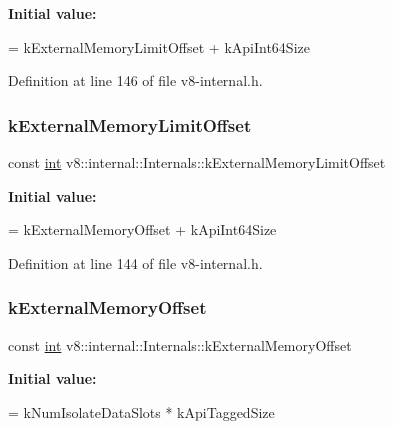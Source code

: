 {\bfseries Initial value\+:}
\begin{DoxyCode}
=
      kExternalMemoryLimitOffset + kApiInt64Size
\end{DoxyCode}


Definition at line 146 of file v8-\/internal.\+h.

\mbox{\label{classv8_1_1internal_1_1Internals_ac38870732a7ff5fb135a78a911e9dbc6}} 
\subsubsection{\texorpdfstring{k\+External\+Memory\+Limit\+Offset}{kExternalMemoryLimitOffset}}
{\footnotesize\ttfamily const \mbox{\hyperlink{classint}{int}} v8\+::internal\+::\+Internals\+::k\+External\+Memory\+Limit\+Offset\hspace{0.3cm}{\ttfamily [static]}}

{\bfseries Initial value\+:}
\begin{DoxyCode}
=
      kExternalMemoryOffset + kApiInt64Size
\end{DoxyCode}


Definition at line 144 of file v8-\/internal.\+h.

\mbox{\label{classv8_1_1internal_1_1Internals_a29ea1efa730a5108018424287556faa1}} 
\subsubsection{\texorpdfstring{k\+External\+Memory\+Offset}{kExternalMemoryOffset}}
{\footnotesize\ttfamily const \mbox{\hyperlink{classint}{int}} v8\+::internal\+::\+Internals\+::k\+External\+Memory\+Offset\hspace{0.3cm}{\ttfamily [static]}}

{\bfseries Initial value\+:}
\begin{DoxyCode}
=
      kNumIsolateDataSlots * kApiTaggedSize
\end{DoxyCode}


